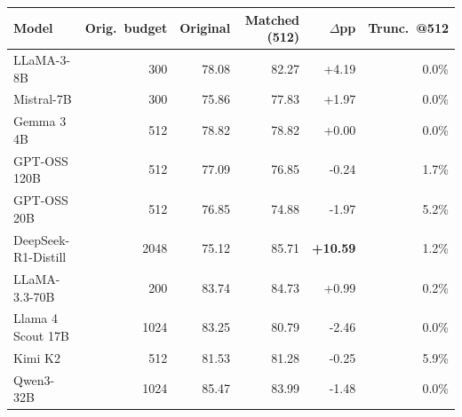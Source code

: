 \begin{tabular}{lrrrrr}
\toprule
Model & Orig.\ budget & Original & Matched (512) & $\Delta$pp & Trunc.\ @512 \\
\midrule
LLaMA-3-8B & 300 & 78.08 & 82.27 & +4.19 & 0.0\% \\
Mistral-7B & 300 & 75.86 & 77.83 & +1.97 & 0.0\% \\
Gemma 3 4B & 512 & 78.82 & 78.82 & +0.00 & 0.0\% \\
GPT-OSS 120B & 512 & 77.09 & 76.85 & -0.24 & 1.7\% \\
GPT-OSS 20B & 512 & 76.85 & 74.88 & -1.97 & 5.2\% \\
DeepSeek-R1-Distill & 2048 & 75.12 & 85.71 & \textbf{+10.59} & 1.2\% \\
LLaMA-3.3-70B & 200 & 83.74 & 84.73 & +0.99 & 0.2\% \\
Llama 4 Scout 17B & 1024 & 83.25 & 80.79 & -2.46 & 0.0\% \\
Kimi K2 & 512 & 81.53 & 81.28 & -0.25 & 5.9\% \\
Qwen3-32B & 1024 & 85.47 & 83.99 & -1.48 & 0.0\% \\
\bottomrule
\end{tabular}
